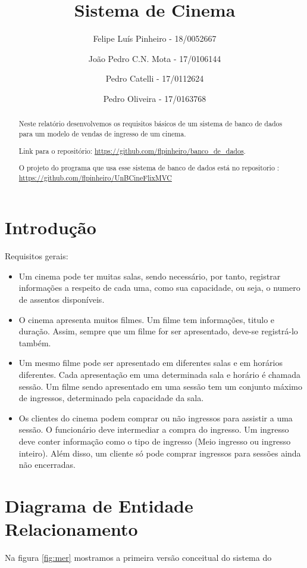 \documentclass[a4paper,10pt]{article}
\title{Sistema de Cinema}
\author{
Felipe Luís Pinheiro - 18/0052667 \and 
João Pedro C.N. Mota - 17/0106144 \and 
Pedro Catelli - 17/0112624 \and
Pedro Oliveira - 17/0163768}
\begin{document}
\maketitle

\begin{abstract}
Neste relatório desenvolvemos os requisitos básicos de um sistema de banco de dados para um modelo de vendas de ingresso de um cinema. 

Link para o repositório: \url{https://github.com/flpinheiro/banco_de_dados}.

O projeto do programa que usa esse sistema de banco de dados está no repositorio : \url{https://github.com/flpinheiro/UnBCineFlixMVC}
\end{abstract}

\section{Introdução}

Requisitos gerais:

\begin{itemize}
	\item Um cinema pode ter muitas salas, sendo necessário, por tanto, registrar informações a respeito de cada uma, como sua capacidade, ou seja, o numero de assentos disponíveis.
	\item O cinema apresenta muitos filmes. Um filme tem informações, titulo e duração. Assim, sempre que um filme for ser apresentado, deve-se registrá-lo também.
	\item Um mesmo filme pode ser apresentado em diferentes salas e em horários diferentes. Cada apresentação em uma determinada sala e horário é chamada sessão. Um filme sendo apresentado em uma sessão tem um conjunto máximo de ingressos, determinado pela capacidade da sala.
	\item Os clientes do cinema podem comprar ou não ingressos para assistir a uma sessão. O
funcionário deve intermediar a compra do ingresso. Um ingresso deve conter informação
como o tipo de ingresso (Meio ingresso ou ingresso inteiro). Além disso, um cliente só pode
comprar ingressos para sessões ainda não encerradas.
\end{itemize}

\section{Diagrama de Entidade Relacionamento}

Na figura \ref{fig:mer} mostramos a primeira versão conceitual do sistema do
\end{document}

